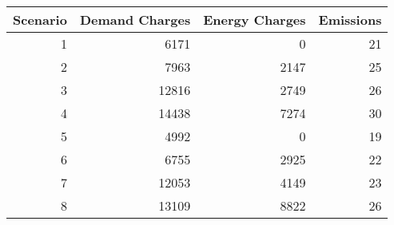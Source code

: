 \begin{tabular}{rrrr}
\toprule
 Scenario &  Demand Charges &  Energy Charges &  Emissions \\
\midrule
        1 &            6171 &               0 &         21 \\
        2 &            7963 &            2147 &         25 \\
        3 &           12816 &            2749 &         26 \\
        4 &           14438 &            7274 &         30 \\
        5 &            4992 &               0 &         19 \\
        6 &            6755 &            2925 &         22 \\
        7 &           12053 &            4149 &         23 \\
        8 &           13109 &            8822 &         26 \\
\bottomrule
\end{tabular}
